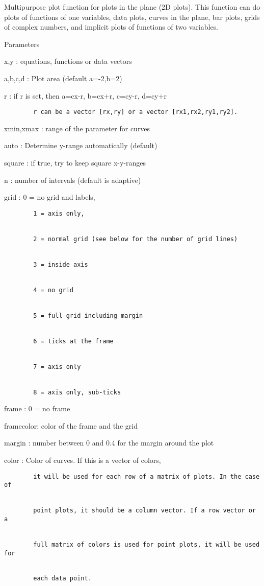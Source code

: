 \documentclass[
]{book}
\begin{document}
Multipurpose plot function for plots in the plane (2D plots). This function can do plots of functions of one variables, data plots, curves in the plane, bar plots, grids of complex numbers, and implicit plots of functions of two variables.

Parameters

x,y : equations, functions or data vectors

a,b,c,d : Plot area (default a=-2,b=2)

r : if r is set, then a=cx-r, b=cx+r, c=cy-r, d=cy+r

\begin{verbatim}
        r can be a vector [rx,ry] or a vector [rx1,rx2,ry1,ry2].
\end{verbatim}

xmin,xmax : range of the parameter for curves

auto : Determine y-range automatically (default)

square : if true, try to keep square x-y-ranges

n : number of intervals (default is adaptive)

grid : 0 = no grid and labels,

\begin{verbatim}
        1 = axis only,


        2 = normal grid (see below for the number of grid lines)


        3 = inside axis


        4 = no grid


        5 = full grid including margin


        6 = ticks at the frame


        7 = axis only


        8 = axis only, sub-ticks
\end{verbatim}

frame : 0 = no frame

framecolor: color of the frame and the grid

margin : number between 0 and 0.4 for the margin around the plot

color : Color of curves. If this is a vector of colors,

\begin{verbatim}
        it will be used for each row of a matrix of plots. In the case of


        point plots, it should be a column vector. If a row vector or a


        full matrix of colors is used for point plots, it will be used for


        each data point.
\end{verbatim}
\end{document}
